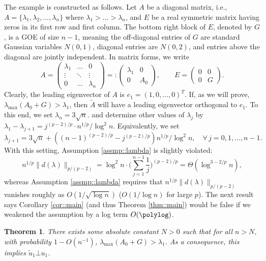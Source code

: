 \documentclass[12pt]{article}%
\theoremstyle{plain}%
\newtheorem{thm}{Theorem}[section]
\theoremstyle{remark}
\begin{document}
The example is constructed as follows. Let $A$ be a diagonal matrix, i.e., $A = \{ \lambda_1, \lambda_2,\ldots, \lambda_n\}$ where $\lambda_1 > \ldots > \lambda_n$, and $E$ be a real symmetric matrix having zeros in its first row and first column. The bottom right block of $E$, denoted by $G$, is a GOE of size $n-1$, meaning the off-diagonal entries of $G$ are standard Gaussian variables $N(0,1)$, diagonal entries are $N(0,2)$, and entries above the diagonal are jointly independent. In matrix forms, we write
\begin{equation*}
A = \left( \begin{array}{ccc} \lambda_1 & \ldots & 0 \\ \vdots & \ddots & \vdots \\ 0 & \ldots & \lambda_n \end{array} \right) =: 
\left( \begin{array}{cc} \lambda_1 & 0 \\ 0 & A_0 \end{array} \right), \qquad 
E = \left( \begin{array}{cc}0 & 0 \\ 0 & G \end{array} \right).
\end{equation*}
Clearly, the leading eigenvector of $A$ is $e_1 = (1,0,\ldots,0)^T$. If, as we will prove, $\lambda_{\max}(A_0 + G) > \lambda_1$, then $\tilde{A}$ will have a leading eigenvector orthogonal to $e_1$. To this end, we set $\lambda_n = 3\sqrt{n}$. and determine other values of $\lambda_j$ by $\lambda_1 - \lambda_{j+1} = j^{(p-2)/p} \cdot n^{1/p} / \log^2 n$. Equivalently, we set
\begin{equation*}
\lambda_{j+1} = 3\sqrt{n} + ((n-1)^{(p-2)/p} - j^{(p-2)/p}) n^{1/p} / \log^2 n, \quad \forall \, j=0,1,\ldots,n-1.
\end{equation*}
With this setting, Assumption \ref{assmp::lambda} is slightly violated:
\begin{equation*}
n^{1/p} \| d(\lambda) \|_{p/(p-2)} = \log^2 n \cdot \Big( \sum_{j=1}^{n-1} \frac{1}{j} \Big)^{(p-2)/p} = \Theta(\log^{3 - 2/p} n),
\end{equation*}
whereas Assumption \ref{assmp::lambda} requires that $n^{1/p} \| d(\lambda) \|_{p/(p-2)}$ vanishes roughly as $O(1/\sqrt{\log n})$ ($O(1/\log n)$ for large $p$). The next result says Corollary \ref{cor::main} (and thus Theorem \ref{thm::main}) would be false if we weakened the assumption by a log term $O(\polylog)$.
\begin{thm}\label{thm::main3}
There exists some absolute constant $N > 0$ such that for all $n > N$, with probability $1 - O(n^{-1})$, $\lambda_{\max}(A_0 + G) > \lambda_1$. As a consequence, this implies $\tilde{u}_1 \bot u_1$.
\end{thm}
\end{document}
